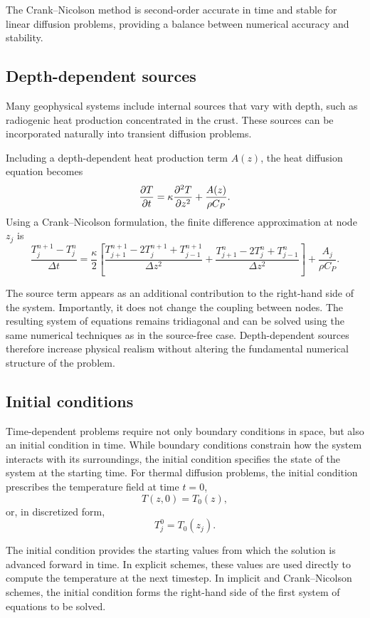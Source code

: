 The Crank--Nicolson method is second-order accurate in time and stable for linear diffusion problems, providing a balance between numerical accuracy and stability.

\subsection{Depth-dependent sources}

Many geophysical systems include internal sources that vary with depth, such as
radiogenic heat production concentrated in the crust. These sources can be
incorporated naturally into transient diffusion problems.

Including a depth-dependent heat production term $A(z)$, the heat diffusion
equation becomes
\[
    \pdv{T}{t} = \kappa \pdv[2]{T}{z} + \frac{A(z)}{\rho C_P}.
\]
Using a Crank--Nicolson formulation, the finite difference approximation at node $z_j$ is
\[
    \frac{T_j^{n+1} - T_j^n}{\Delta t} =
    \frac{\kappa}{2} \left[
    \frac{T_{j+1}^{n+1} - 2T_j^{n+1} + T_{j-1}^{n+1}}{\Delta z^2} +
    \frac{T_{j+1}^{n} - 2T_j^{n} + T_{j-1}^{n}}{\Delta z^2}
    \right] + \frac{A_j}{\rho C_P} .
\]

The source term appears as an additional contribution to the right-hand side of the system. Importantly, it does not change the coupling between nodes. The resulting system of equations remains tridiagonal and can be solved using the same numerical techniques as in the source-free case.  Depth-dependent sources therefore increase physical realism without altering
the fundamental numerical structure of the problem.

\subsection{Initial conditions}

Time-dependent problems require not only boundary conditions in space, but also an initial condition in time. While boundary conditions constrain how the system interacts with its surroundings, the initial condition specifies the
state of the system at the starting time.  For thermal diffusion problems, the initial condition prescribes the temperature field at time $t = 0$,
\[
    T(z,0) = T_0(z),
\]
or, in discretized form,
\[
    T_j^{0} = T_0(z_j).
\]

The initial condition provides the starting values from which the solution is advanced forward in time. In explicit schemes, these values are used directly to compute the temperature at the next timestep. In implicit and Crank--Nicolson schemes, the initial condition forms the right-hand side of the first system of equations to be solved.  

